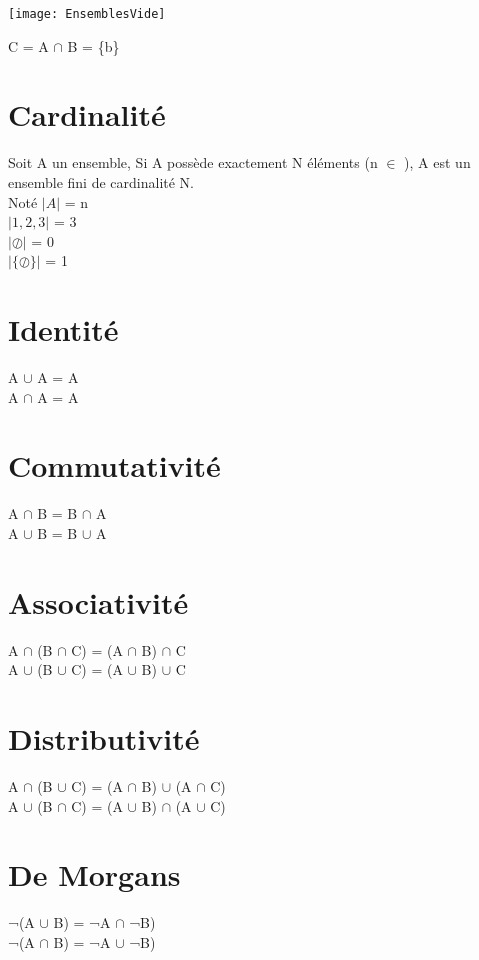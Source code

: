 \texttt{[image: EnsemblesVide]}
\vspace{3mm} %

C = A $\cap$ B = \{b\}

\newpage
\section{Cardinalité}

Soit A un ensemble, Si A possède exactement N éléments (n $\in$ \N), A est un ensemble fini de cardinalité N.\\

Noté $|A|$ = n \\

$|1,2,3|$ = 3 \\

$|\oslash|$ = 0 \\

$|\{\oslash\}|$ = 1 \\

\section{Identité}

A $\cup$ A = A \\
A $\cap$ A = A \\

\section{Commutativité}

A $\cap$ B  = B $\cap$ A \\
A $\cup$ B  = B $\cup$ A \\

\section{Associativité}

A $\cap$ (B $\cap$ C) = (A $\cap$ B) $\cap$ C \\
A $\cup$ (B $\cup$ C) = (A $\cup$ B) $\cup$ C \\

\section{Distributivité}

A $\cap$ (B $\cup$ C) = (A $\cap$ B) $\cup$ (A $\cap$ C) \\
A $\cup$ (B $\cap$ C) = (A $\cup$ B) $\cap$ (A $\cup$ C) \\

\section{De Morgans}

¬(A $\cup$ B) = ¬A $\cap$ ¬B) \\
¬(A $\cap$ B) = ¬A $\cup$ ¬B) \\
